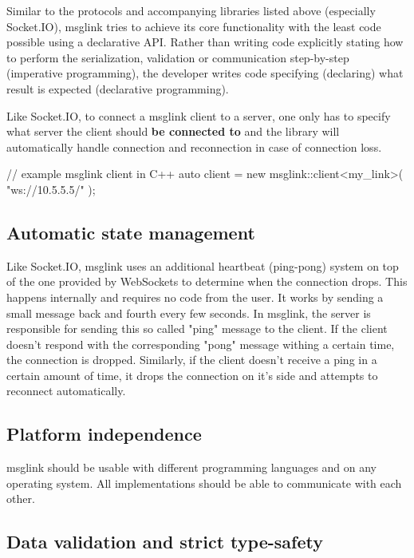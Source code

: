 \documentclass[conference]{IEEEtran}
\begin{document}
Similar to the protocols and accompanying libraries listed above (especially Socket.IO), msglink tries to achieve its core functionality with the least code possible using a declarative API. Rather than writing code explicitly stating how to perform the serialization, validation or communication step-by-step (imperative programming), the developer writes code specifying (declaring) what result is expected (declarative programming). \cite{imperative-vs-declarative}

Like Socket.IO, to connect a msglink client to a server, one only has to specify what server the client should \textbf{be connected to} and the library will automatically handle connection and reconnection in case of connection loss. 

\begin{code-cpp}
// example msglink client in C++
auto client = new msglink::client<my_link>(
    "ws://10.5.5.5/"
);
\end{code-cpp}

\subsection{Automatic state management}

Like Socket.IO, msglink uses an additional heartbeat (ping-pong) system on top of the one provided by WebSockets to determine when the connection drops. This happens internally and requires no code from the user. It works by sending a small message back and fourth every few seconds. In msglink, the server is responsible for sending this so called "ping" message to the client. If the client doesn't respond with the corresponding "pong" message withing a certain time, the connection is dropped. Similarly, if the client doesn't receive a ping in a certain amount of time, it drops the connection on it's side and attempts to reconnect automatically.


\subsection{Platform independence}

msglink should be usable with different programming languages and on any operating system. All implementations should be able to communicate with each other.


\subsection{Data validation and strict type-safety}
\end{document}
